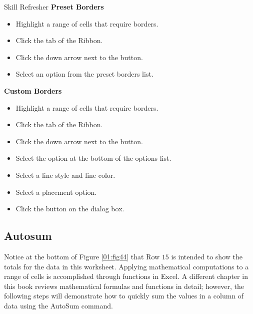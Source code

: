 \begin{center}
	\begin{sklbox}{Skill Refresher}
		\textbf{Preset Borders}
		\\
		\begin{itemize}
			\setlength{\itemsep}{0pt}
			\setlength{\parskip}{0pt}
			\setlength{\parsep}{0pt}
			
			\item Highlight a range of cells that require borders.
			\item Click the  tab of the Ribbon.
			\item Click the down arrow next to the  button.
			\item Select an option from the preset borders list.
			
		\end{itemize}

		\hfill \break
		\textbf{Custom Borders}
		\\
		\begin{itemize}
			\setlength{\itemsep}{0pt}
			\setlength{\parskip}{0pt}
			\setlength{\parsep}{0pt}
			
			\item Highlight a range of cells that require borders.
			\item Click the  tab of the Ribbon.
			\item Click the down arrow next to the  button.
			\item Select the  option at the bottom of the options list.
			\item Select a line style and line color.
			\item Select a placement option.
			\item Click the  button on the dialog box.
			
		\end{itemize}

	\end{sklbox}
\end{center}

\subsection{Autosum}

Notice at the bottom of Figure \ref{01:fig44} that Row $ 15 $ is intended to show the totals for the data in this worksheet. Applying mathematical computations to a range of cells is accomplished through functions in Excel. A different chapter in this book reviews mathematical formulas and functions in detail; however, the following steps will demonstrate how to quickly sum the values in a column of data using the AutoSum command.

